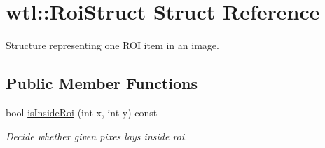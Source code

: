 \hypertarget{structwtl_1_1_roi_struct}{}\section{wtl\+:\+:Roi\+Struct Struct Reference}
\label{structwtl_1_1_roi_struct}


Structure representing one R\+OI item in an image.  


\subsection*{Public Member Functions}
\begin{DoxyCompactItemize}
\item 
bool \hyperlink{structwtl_1_1_roi_struct_a0fc95c942e5745a8ff8dd076ccd52e6d}{is\+Inside\+Roi} (int x, int y) const
\begin{DoxyCompactList}\small\item\em Decide whether given pixes lays inside roi. \end{DoxyCompactList}\end{DoxyCompactItemize}
